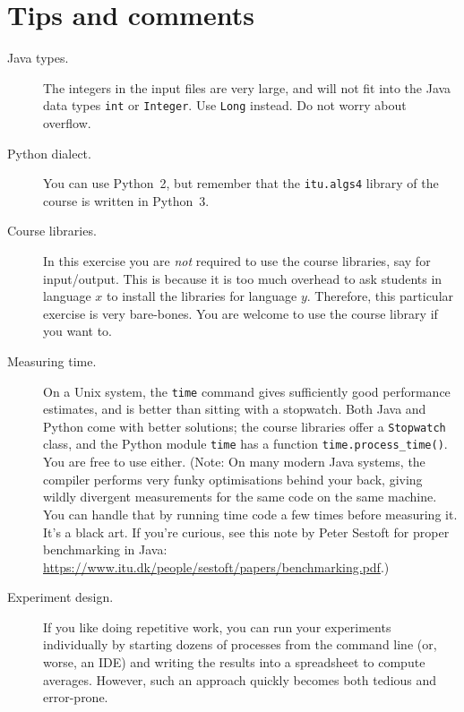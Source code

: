 \documentclass[nobib]{tufte-handout}
\begin{document}
\section{Tips and comments}

\begin{description}
  \item[Java types.] The integers in the input files are very large, and will not fit into the Java data types \texttt{int} or \texttt{Integer}.
    Use \texttt{Long} instead.
    Do not worry about overflow.
  \item[Python dialect.] You can use Python~2, but remember that the \texttt{itu.algs4} library of the course is written in Python~3.
  \item[Course libraries.]
    In this exercise you are \emph{not} required to use the course libraries, say for input/output.
    This is because it is too much overhead to ask students in language $x$ to install the libraries for language $y$.
    Therefore, this particular exercise is very bare-bones.
    You are welcome to use the course library if you want to.
  \item[Measuring time.]
    On a Unix system, the \texttt{time} command gives sufficiently good performance estimates, and is better than sitting with a stopwatch.
    Both Java and Python come with better solutions; the course libraries offer a \texttt{Stopwatch} class, and the Python module \texttt{time} has a function \verb|time.process_time()|. You are free to use either.
    (Note: On many modern Java systems, the compiler performs very funky
    optimisations behind your back, giving wildly divergent measurements for
    the same code on the same machine.  You can handle that by running time
    code a few times before measuring it.  It's a black art.  If you're
    curious, see this note by Peter Sestoft for proper benchmarking in Java:
    \url{https://www.itu.dk/people/sestoft/papers/benchmarking.pdf}.)
  \item[Experiment design.]
    If you like doing repetitive work, you  can run your experiments individually by starting dozens of processes from the command line (or, worse, an IDE) and writing the results into a spreadsheet to compute averages.
    However, such an approach quickly becomes both tedious and error-prone.


\end{description}
\end{document}
